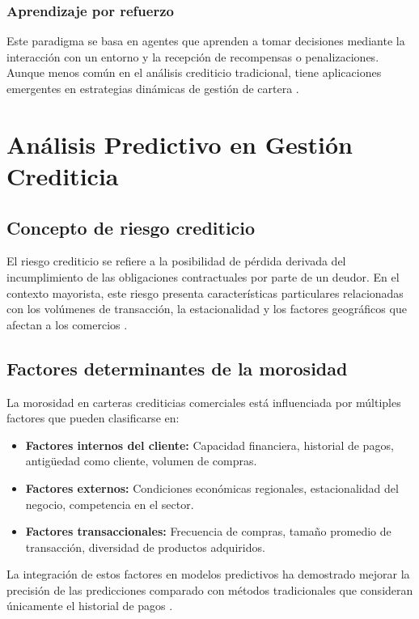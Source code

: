 \subsubsection{Aprendizaje por refuerzo}
Este paradigma se basa en agentes que aprenden a tomar decisiones mediante la interacción con un entorno y la recepción de recompensas o penalizaciones. Aunque menos común en el análisis crediticio tradicional, tiene aplicaciones emergentes en estrategias dinámicas de gestión de cartera \citep{kim2022credit}.

\section{Análisis Predictivo en Gestión Crediticia}
\subsection{Concepto de riesgo crediticio}
El riesgo crediticio se refiere a la posibilidad de pérdida derivada del incumplimiento de las obligaciones contractuales por parte de un deudor. En el contexto mayorista, este riesgo presenta características particulares relacionadas con los volúmenes de transacción, la estacionalidad y los factores geográficos que afectan a los comercios \citep{barroso2022machine}.

\subsection{Factores determinantes de la morosidad}
La morosidad en carteras crediticias comerciales está influenciada por múltiples factores que pueden clasificarse en:

\begin{itemize}
    \item \textbf{Factores internos del cliente:} Capacidad financiera, historial de pagos, antigüedad como cliente, volumen de compras.
    \item \textbf{Factores externos:} Condiciones económicas regionales, estacionalidad del negocio, competencia en el sector.
    \item \textbf{Factores transaccionales:} Frecuencia de compras, tamaño promedio de transacción, diversidad de productos adquiridos.
\end{itemize}

La integración de estos factores en modelos predictivos ha demostrado mejorar la precisión de las predicciones comparado con métodos tradicionales que consideran únicamente el historial de pagos \citep{lessmann2015benchmarking, pena2021credit}.

